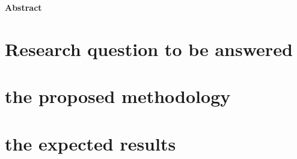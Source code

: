 
\begin{center}\textbf{Abstract}\end{center}

\section{Research question to be answered}

\section{the proposed methodology} 
\section{the expected results}


\cleardoublepage
